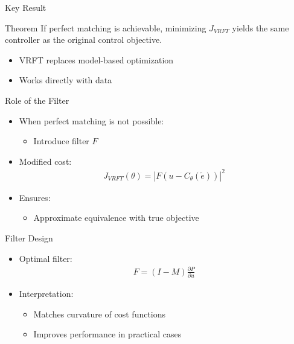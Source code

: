 \documentclass[hyperref={pdfpagemode=FullScreen},aspectratio=169]{beamer}
\begin{document}

\begin{frame}{Key Result}
\begin{block}{Theorem}
If perfect matching is achievable, minimizing $J_{VRFT}$ yields the same controller as the original control objective.
\end{block}

\begin{itemize}
\item VRFT replaces model-based optimization
\item Works directly with data
\end{itemize}
\end{frame}


\begin{frame}{Role of the Filter}
\begin{itemize}
\item When perfect matching is not possible:
\begin{itemize}
\item Introduce filter $F$
\end{itemize}
\item Modified cost:
\begin{align}
J_{VRFT}(\theta) = | F(u - C_\theta(\tilde{e})) |^2
\end{align}
\item Ensures:
\begin{itemize}
\item Approximate equivalence with true objective
\end{itemize}
\end{itemize}
\end{frame}


\begin{frame}{Filter Design}
\begin{itemize}
\item Optimal filter:
\begin{align}
F = (I - M) \frac{\partial P}{\partial u}
\end{align}
\item Interpretation:
\begin{itemize}
\item Matches curvature of cost functions
\item Improves performance in practical cases
\end{itemize}
\end{itemize}
\end{frame}
\end{document}
